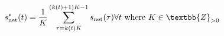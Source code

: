 \begin{equation}
	s^{*}_\text{net}(t) = \frac{1}{K}\sum_{\tau=k(t)K}^{(k(t)+1)K-1}s_\text{net}(\tau) \forall t \text{ where } K \in \textbb{Z}_{>0}
	\label{ch1:equ:down-sampling-to-half-hourly}
\end{equation}